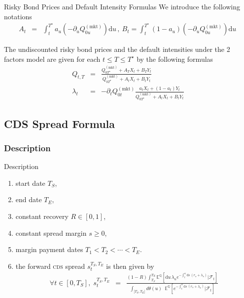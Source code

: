 \documentclass[serif]{beamer}
\newcommand\Qmkt{Q^{(\mathrm{mkt})}}
\newcommand\EE {\mathbb{E}}
\newcommand\QQ {\mathbb{Q}}
\newcommand\F {\mathcal{F}}
\newcommand \dQmkt[1]{\partial_{#1}\Qmkt_{0{#1}}}
\numberwithin{equation}{section}
\newcommand\du{\mathrm{d}u\,}
\newcommand\ds{\mathrm{d}s\,}
\begin{document}
\begin{frame}{Risky Bond Prices and Default Intensity Formulas}
We introduce the following notations
\begin{eqnarray*}
A_t&=&\int_t^{T^\star}{ a_u (-\dQmkt{u})\du}, ~ B_t  = \int_t^{T^\star}{ (1-a_u)  (-\dQmkt{u})\du}
\end{eqnarray*} \pause

\begin{lemma}
The undiscounted risky bond prices and the default intensities under the 2 factors model are given for each $t \leq T \leq T^\star$ by the following formulas
\begin{eqnarray}
   Q_{t,T}&=& \frac{\Qmkt_{0T^\star}+A_T X_t + B_T Y_t }{\Qmkt_{0T^\star}+A_t X_t + B_tY_t } \label{eq::LNI2F_RiskyBonds}\\
\lambda_t &=&-\partial_t \Qmkt_{0t} \frac{ a_t X_t + (1-a_t) Y_t}{\Qmkt_{0T^\star}+A_t X_t + B_tY_t }
\end{eqnarray}
\end{lemma}

\end{frame}



\subsection{CDS Spread Formula}

\subsubsection{Description}

\begin{frame}{Description}
 \begin{enumerate}
 \item<1->  start date $T_S$,
 \item<1->  end date $T_E$,
 \item<1->  constant recovery $R \in [0,1]$,
 \item<1->  constant spread margin $s  \geq 0$,
 \item<1->  margin payment dates $T_1 < T_2 < \cdots < T_E$.
 \item<2->  the forward \textsc{cds} spread $s_{t}^{T_S,T_E}$ is then given by
\begin{eqnarray*}
\forall t \in [0, T_S], \; s_{t}^{T_S,T_E}&=& \frac{(1-R)\int_{T_S}^{T_E}{\EE^\QQ\left[\du \lambda_u e^{-\int_{t}^{u}{\ds (r_s+\lambda_s)}}\Big|\F_t\right] } }{\int_{]T_S,T_E]}{d\theta(u) \;\;\EE^\QQ\left[ e^{-\int_{t}^{u}{\ds (r_s+\lambda_s)}}\Big|\F_t\right]}}\\
\end{eqnarray*}
\end{enumerate}

\end{frame}
\end{document}
